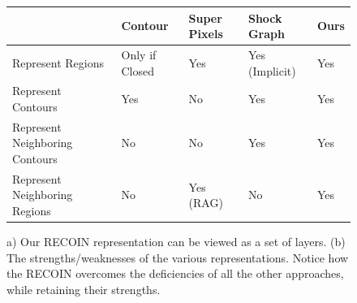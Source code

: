 \begin{figure}[ht]
\centering
{}
  \begin{tabular}{p{1.4cm}|p{1.1cm}|p{1.1cm}|p{0.9cm}|p{0.9cm}|}
    \cline{2-5}
    & Contour & Super Pixels & Shock Graph & Ours \\
    \hline
    \multicolumn{1}{|p{2cm}|}{Represent Regions } & Only if Closed & Yes & Yes (Implicit) & Yes\\
    \hline
    \multicolumn{1}{|p{2cm}|}{Represent Contours } & Yes & No & Yes & Yes\\
    \hline
    \multicolumn{1}{|p{2cm}|}{Represent Neighboring Contours } & No & No & Yes & Yes\\
    \hline
    \multicolumn{1}{|p{2cm}|}{Represent Neighboring Regions } & No & Yes (RAG)  & No & Yes\\
    \hline
  \end{tabular}
\caption{a) Our RECOIN representation can be viewed as a set of layers. (b) The strengths/weaknesses of the various representations. Notice how the RECOIN overcomes the deficiencies of all the other approaches, while retaining their strengths.}
\label{fig:layers}
\end{figure}
